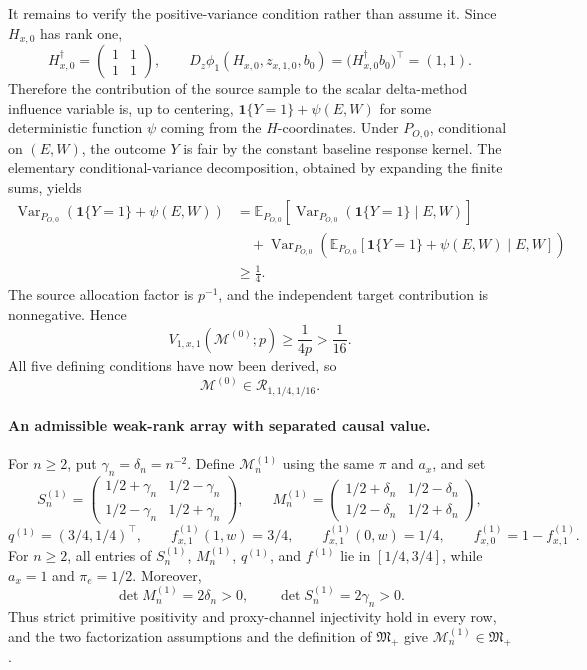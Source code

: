 It remains to verify the positive-variance condition rather than assume it. Since \(H_{x,0}\) has rank one,
\[
H_{x,0}^{\dagger}=
\begin{pmatrix}1&1\\1&1\end{pmatrix},
\qquad
D_z\phi_1(H_{x,0},z_{x,1,0},b_0)
=\bigl(H_{x,0}^{\dagger}b_0\bigr)^{\top}=(1,1).
\]
Therefore the contribution of the source sample to the scalar delta-method influence variable is, up to centering, \(\mathbf 1\{Y=1\}+\psi(E,W)\) for some deterministic function \(\psi\) coming from the \(H\)-coordinates. Under \(P_{O,0}\), conditional on \((E,W)\), the outcome \(Y\) is fair by the constant baseline response kernel. The elementary conditional-variance decomposition, obtained by expanding the finite sums, yields
\[
\begin{split}
\operatorname{Var}_{P_{O,0}}\!\left(\mathbf 1\{Y=1\}+\psi(E,W)\right)
&=\mathbb E_{P_{O,0}}\!\left[\operatorname{Var}_{P_{O,0}}\!\left(\mathbf 1\{Y=1\}\mid E,W\right)\right]\\
&\quad+\operatorname{Var}_{P_{O,0}}\!\left(
\mathbb E_{P_{O,0}}[\mathbf 1\{Y=1\}+\psi(E,W)\mid E,W]
\right)\\
&\ge\frac14.
\end{split}
\]
The source allocation factor is \(p^{-1}\), and the independent target contribution is nonnegative. Hence
\[
V_{1,x,1}(\mathcal M^{(0)};p)\ge\frac{1}{4p}>\frac1{16}.
\]
All five defining conditions have now been derived, so
\[
\mathcal M^{(0)}\in\mathcal R_{1,1/4,1/16}.
\]

\paragraph{An admissible weak-rank array with separated causal value.}
For \(n\ge2\), put \(\gamma_n=\delta_n=n^{-2}\). Define \(\mathcal M^{(1)}_n\) using the same \(\pi\) and \(a_x\), and set
\[
S^{(1)}_n=
\begin{pmatrix}
1/2+\gamma_n&1/2-\gamma_n\\
1/2-\gamma_n&1/2+\gamma_n
\end{pmatrix},\qquad
M^{(1)}_n=
\begin{pmatrix}
1/2+\delta_n&1/2-\delta_n\\
1/2-\delta_n&1/2+\delta_n
\end{pmatrix},
\]
\[
q^{(1)}=(3/4,1/4)^{\top},\qquad
f^{(1)}_{x,1}(1,w)=3/4,\qquad
f^{(1)}_{x,1}(0,w)=1/4,\qquad
f^{(1)}_{x,0}=1-f^{(1)}_{x,1}.
\]
For \(n\ge2\), all entries of \(S^{(1)}_n\), \(M^{(1)}_n\), \(q^{(1)}\), and \(f^{(1)}\) lie in \([1/4,3/4]\), while \(a_x=1\) and \(\pi_e=1/2\). Moreover,
\[
\det M^{(1)}_n=2\delta_n>0,
\qquad
\det S^{(1)}_n=2\gamma_n>0.
\]
Thus strict primitive positivity and proxy-channel injectivity hold in every row, and the two factorization assumptions and the definition of \(\mathfrak M_{+}\) give \(\mathcal M^{(1)}_n\in\mathfrak M_{+}\).

